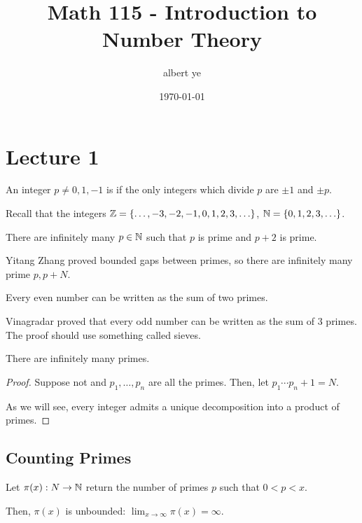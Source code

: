 \documentclass{article}
\title{Math 115 - Introduction to Number Theory}
\author{albert ye}
\date{\today}
\begin{document}
\maketitle

\section{Lecture 1}
\begin{definition}
    An integer $p \neq 0, 1, -1$ is  if the only integers which divide $p$ are $\pm 1$ and $\pm p$.
\end{definition}

Recall that the integers $\mathbb Z = \{\ldots, -3, -2, -1, 0, 1, 2, 3, \ldots\}$, $\mathbb N = \{0, 1, 2, 3, \ldots\}$.

\begin{theorem}
    There are infinitely many $p \in \mathbb N$ such that $p$ is prime and $p + 2$ is prime.
\end{theorem}

Yitang Zhang proved bounded gaps between primes, so there are infinitely many prime $p, p + N$.

\begin{theorem}
    Every even number can be written as the sum of two primes.
\end{theorem}

Vinagradar proved that every odd number can be written as the sum of $3$ primes. The proof should use something called sieves.

\begin{proposition}
    There are infinitely many primes.
\end{proposition}

\begin{proof}
    Suppose not and $p_1, \ldots, p_n$ are all the primes. Then, let $p_1\cdots p_n + 1 = N$. 
    
    As we will see, every integer admits a unique decomposition into a product of primes.
\end{proof}

\subsection{Counting Primes}
Let $\pi(x) : N \to \mathbb N$ return the number of primes $p$ such that $0 < p < x$.

Then, $\pi(x)$ is unbounded: $\lim_{x \to \infty} \pi(x) = \infty$. 
\end{document}
